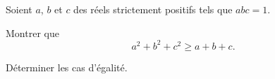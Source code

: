 Soient $a$, $b$ et $c$ des réels strictement positifs tels que $abc = 1$.

Montrer que
\[
a^2 + b^2 + c^2 \geqslant a + b + c.
\]

Déterminer les cas d'égalité.
